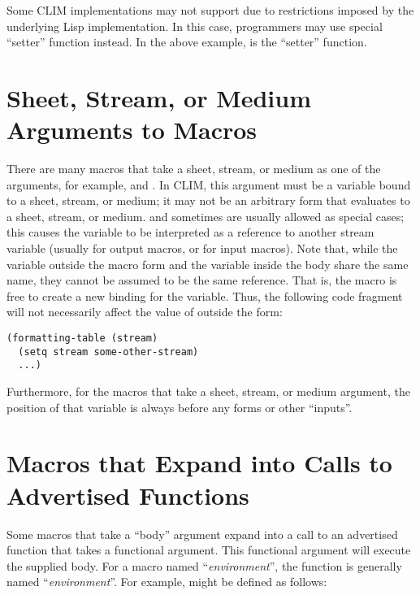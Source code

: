 Some CLIM implementations may not support  due to restrictions imposed
by the underlying Lisp implementation.  In this case, programmers may use
special ``setter'' function instead.  In the above example,
 is the ``setter'' function.


\section {Sheet, Stream, or Medium Arguments to Macros}

There are many macros that take a sheet, stream, or medium as one of the
arguments, for example,  and .
In CLIM, this argument must be a variable bound to a sheet, stream, or medium;
it may not be an arbitrary form that evaluates to a sheet, stream, or medium.
 and sometimes  are usually allowed as special cases; this causes
the variable to be interpreted as a reference to another stream variable
(usually  for output macros, or  for
input macros).  Note that, while the variable outside the macro form and the
variable inside the body share the same name, they cannot be assumed to be the
same reference.  That is, the macro is free to create a new binding for the
variable.  Thus, the following code fragment will not necessarily affect the
value of  outside the  form:

\begin{verbatim}
(formatting-table (stream)
  (setq stream some-other-stream)
  ...)
\end{verbatim}

Furthermore, for the macros that take a sheet, stream, or medium argument, the
position of that variable is always before any forms or other ``inputs''.


\section {Macros that Expand into Calls to Advertised Functions}

Some macros that take a ``body'' argument expand into a call to an advertised
function that takes a functional argument.  This functional argument will
execute the supplied body.  For a macro named ``{\it {}environment}'',
the function is generally named ``{\it {}environment}''.  For
example,  might be defined as follows:

